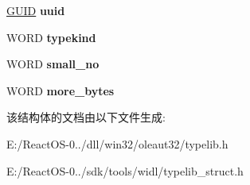 \begin{DoxyCompactItemize}
\item 
\mbox{\label{struct_s_l_t_g___other_type_info_a22a16f05fde3c1da3cea7298d30d80a4}} 
\hyperlink{interface_g_u_i_d}{G\+U\+ID} {\bfseries uuid}
\item 
\mbox{\label{struct_s_l_t_g___other_type_info_a2ad2a03059a50dc1dd4bba76ea97999b}} 
W\+O\+RD {\bfseries typekind}
\item 
\mbox{\label{struct_s_l_t_g___other_type_info_a028cb52d51f700a34f46e4961e206c5f}} 
W\+O\+RD {\bfseries small\+\_\+no}
\item 
\mbox{\label{struct_s_l_t_g___other_type_info_a875b688f9311232056d2062a60bf6645}} 
W\+O\+RD {\bfseries more\+\_\+bytes}
\end{DoxyCompactItemize}


该结构体的文档由以下文件生成\+:\begin{DoxyCompactItemize}
\item 
E\+:/\+React\+O\+S-\/0../dll/win32/oleaut32/typelib.\+h\item 
E\+:/\+React\+O\+S-\/0../sdk/tools/widl/typelib\+\_\+struct.\+h\end{DoxyCompactItemize}
